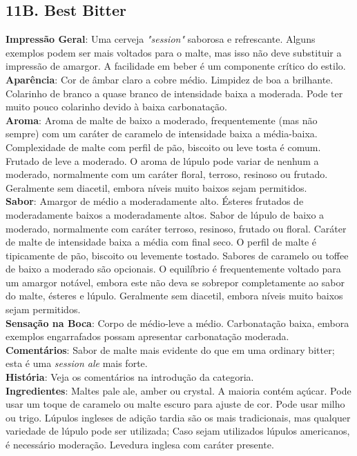 \subsection*{11B. Best Bitter}
\textbf{Impressão Geral}: Uma cerveja \textit{"session"} saborosa e refrescante. Alguns exemplos podem ser mais voltados para o malte, mas isso não deve substituir a impressão de amargor. A facilidade em beber é um componente crítico do estilo.\\
\textbf{Aparência}: Cor de âmbar claro a cobre médio. Limpidez de boa a brilhante. Colarinho de branco a quase branco de intensidade baixa a moderada. Pode ter muito pouco colarinho devido à baixa carbonatação.\\
\textbf{Aroma}: Aroma de malte de baixo a moderado, frequentemente (mas não sempre) com um caráter de caramelo de intensidade baixa a média-baixa. Complexidade de malte com perfil de pão, biscoito ou leve tosta é comum. Frutado de leve a moderado. O aroma de lúpulo pode variar de nenhum a moderado, normalmente com um caráter floral, terroso, resinoso ou frutado. Geralmente sem diacetil, embora níveis muito baixos sejam permitidos.\\
\textbf{Sabor}: Amargor de médio a moderadamente alto. Ésteres frutados de moderadamente baixos a moderadamente altos. Sabor de lúpulo de baixo a moderado, normalmente com caráter terroso, resinoso, frutado ou floral. Caráter de malte de intensidade baixa a média com final seco. O perfil de malte é tipicamente de pão, biscoito ou levemente tostado. Sabores de caramelo ou toffee de baixo a moderado são opcionais. O equilíbrio é frequentemente voltado para um amargor notável, embora este não deva se sobrepor completamente ao sabor do malte, ésteres e lúpulo. Geralmente sem diacetil, embora níveis muito baixos sejam permitidos.\\
\textbf{Sensação na Boca}: Corpo de médio-leve a médio. Carbonatação baixa, embora exemplos engarrafados possam apresentar carbonatação moderada.\\
\textbf{Comentários}: Sabor de malte mais evidente do que em uma ordinary bitter; esta é uma \textit{session ale} mais forte.\\
\textbf{História}: Veja os comentários na introdução da categoria.\\
\textbf{Ingredientes}: Maltes pale ale, amber ou crystal. A maioria contém açúcar. Pode usar um toque de caramelo ou malte escuro para ajuste de cor. Pode usar milho ou trigo. Lúpulos ingleses de adição tardia são os mais tradicionais, mas qualquer variedade de lúpulo pode ser utilizada; Caso sejam utilizados lúpulos americanos, é necessário moderação. Levedura inglesa com caráter presente.\\
